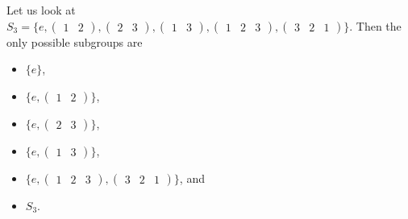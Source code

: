 \begin{example}
    Let us look at $S_{3} = \{e,\begin{pmatrix}
        1 & 2
    \end{pmatrix},\begin{pmatrix}
        2 & 3
    \end{pmatrix},\begin{pmatrix}
        1 & 3
    \end{pmatrix},\begin{pmatrix}
        1 & 2 & 3
    \end{pmatrix},\begin{pmatrix}
        3 & 2 & 1
    \end{pmatrix}\}$. Then the only possible subgroups are
    \begin{itemize}
        \item $\{e\}$,
        \item $\{e, \begin{pmatrix}
            1 & 2
        \end{pmatrix}\}$,
        \item $\{e, \begin{pmatrix}
            2 & 3
        \end{pmatrix}\}$,
        \item $\{e, \begin{pmatrix}
            1 & 3
        \end{pmatrix}\}$,
        \item $\{e, \begin{pmatrix}
            1 & 2 & 3
        \end{pmatrix}, \begin{pmatrix}
            3 & 2 & 1
        \end{pmatrix}\}$, and
        \item $S_{3}$.
    \end{itemize}
\end{example}

